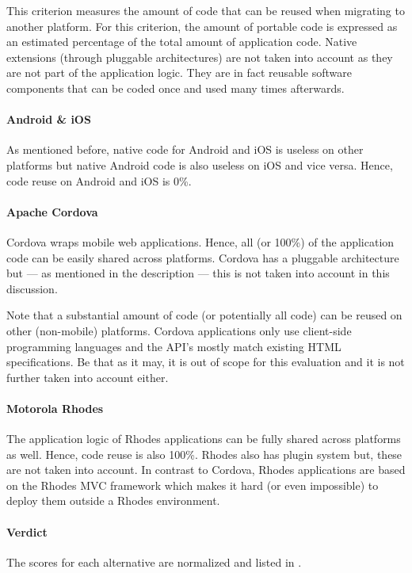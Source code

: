 This criterion measures the amount of code that can be reused when migrating to another platform. For this criterion, the amount of portable code is expressed as an estimated percentage of the total amount of application code. Native extensions (through pluggable architectures) are not taken into account as they are not part of the application logic. They are in fact reusable software components that can be coded once and used many times afterwards. 

\paragraph{Android \& iOS} As mentioned before, native code for Android and iOS is useless on other platforms but native Android code is also useless on iOS and vice versa. Hence, code reuse on Android and iOS is 0\%.

\paragraph{Apache Cordova} Cordova wraps mobile web applications. Hence, all (or 100\%) of the application code can be easily shared across platforms. Cordova has a pluggable architecture but --- as mentioned in the description --- this is not taken into account in this discussion.

Note that a substantial amount of code (or potentially all code) can be reused on other (non-mobile) platforms. Cordova applications only use client-side programming languages and the API's mostly match existing HTML specifications. Be that as it may, it is out of scope for this evaluation and it is not further taken into account either.

\paragraph{Motorola Rhodes} The application logic of Rhodes applications can be fully shared across platforms as well. Hence, code reuse is also 100\%. Rhodes also has plugin system but, these are not taken into account. In contrast to Cordova, Rhodes applications are based on the Rhodes MVC framework which makes it hard (or even impossible) to deploy them outside a Rhodes environment.

\paragraph{Verdict} The scores for each alternative are normalized and listed in . 

